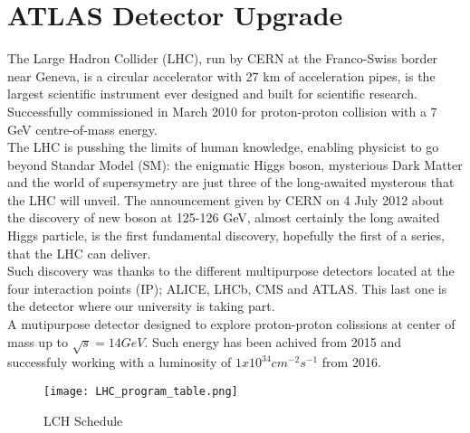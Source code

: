 \section{ATLAS Detector Upgrade}

The Large Hadron Collider (LHC), run by CERN at the Franco-Swiss border near Geneva, is a circular accelerator with 27 km of acceleration pipes, is the largest scientific instrument ever designed and built for scientific research. Successfully commissioned in March 2010 for proton-proton collision with a 7 GeV centre-of-mass energy.\\
The LHC is pusshing the limits of human knowledge, enabling physicist to go beyond Standar Model (SM): the enigmatic Higgs boson, mysterious Dark Matter and the world of supersymetry are just three of the long-awaited mysterous that the LHC will unveil. The announcement given by CERN on 4 July 2012 about the discovery of new boson at 125-126 GeV, almost certainly the long awaited Higgs particle, is the first fundamental discovery, hopefully the first of a series, that the LHC can deliver.\\
Such discovery was thanks to the different multipurpose detectors located at the four interaction points (IP); ALICE, LHCb, CMS and ATLAS. This last one is the detector where our university is taking part.\\
A mutipurpose detector designed to explore proton-proton colissions at center of mass up to $\sqrt{s}=14GeV$. Such energy has been achived from 2015 and successfuly working with a luminosity of $1x10^{34}cm^{-2}s^{-1}$ from 2016.\\
\begin{figure}[h]
		\centering
		\texttt{[image: LHC\_program\_table.png]}
		\caption{LCH Schedule}\label{fig:a}
\end{figure}
